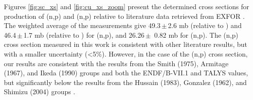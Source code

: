 Figures \ref{fig:sc_xs} and \ref{fig:cu_xs_zoom} present the determined cross sections for  production of  (n,p) and (n,p)  relative to literature data retrieved from EXFOR \cite{Otuka2014272,PhysRev.114.565,doi:10.1143/JPSJ.17.1215,paulsen1967cross,doi:10.1139/p72-336,Smith1975,King1979,Hussain1983,Ikeda1991,Shimizu2004543,PhysRev.126.271,Armitage1967,Ikeda1990,Senga2000,Shimizu2004975}.
The weighted average of the measurements give   49.3\,$\pm$\,2.6 mb (relative to ) and 46.4\,$\pm$\,1.7 mb (relative to )   for (n,p),   and 26.26\,$\pm$\, 0.82 mb for  (n,p).
The (n,p) cross section measured in this work is consistent with  other literature results, but with a smaller uncertainty (\textless 5\%).
However, in the case of the (n,p) cross section, our results are consistent with the results from the Smith (1975), Armitage (1967), and Ikeda (1990) groups \cite{Smith1975,Armitage1967,Ikeda1990} and both the ENDF/B-VII.1 \cite{Chadwick2011} and TALYS \cite{Koning2012}  values, but significantly below the results from the Hussain (1983), Gonzalez (1962), and Shimizu (2004) groups \cite{Hussain1983,PhysRev.126.271,Shimizu2004975}.
 






